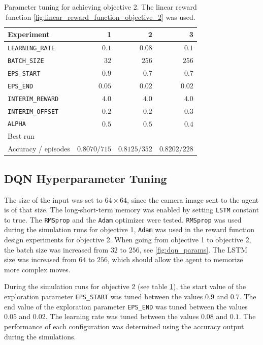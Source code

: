 \documentclass[11pt, onecolumn, oneside, reqno]{amsart}
\begin{document}
\begin{table}[thpb]
	\centering
	\renewcommand{\arraystretch}{1.3}
	\begin{tabular}{|l|r|r|r|}
	\hline
	Experiment & 1 & 2 & 3 \\
	\hline
	\texttt{LEARNING\_RATE} & $0.1$  & $0.08$ & $0.1$  \\
	\texttt{BATCH\_SIZE}    & $32$   & $256$  & $256$  \\
	\texttt{EPS\_START}     & $0.9$  & $0.7$  & $0.7$  \\
	\texttt{EPS\_END}       & $0.05$ & $0.02$ & $0.02$ \\
	\hline
	\texttt{INTERIM\_REWARD} & $4.0$ & $4.0$ & $4.0$ \\
	\texttt{INTERIM\_OFFSET} & $0.2$ & $0.2$ & $0.3$ \\
	\hline
	\texttt{ALPHA} & $0.5$ & $0.5$ &  $0.4$\\
	\hline
	\multicolumn{4}{|l|}{Best run} \\ 
	\hline
	Accuracy / episodes & $0.8070 / 715$ &  $0.8125 / 352$ & $0.8202 / 228$ \\
	\hline
	\end{tabular}
	\caption{Parameter tuning for achieving objective 2. The linear reward function \ref{fig:linear_reward_function_objective_2} was used.}
	\label{tab:reward_param_tuning_objective_2}
\end{table}


\subsection{DQN Hyperparameter Tuning}
\label{sec:dqn_parameter_tuning}
The size of the input was set to $64 \times 64$, since the camera image sent to the agent is of that size. The long-short-term memory was enabled by setting \texttt{LSTM} constant to true. The \texttt{RMSprop} and the \texttt{Adam} optimizer \cite{adam_paper} were tested. \texttt{RMSprop} was used during the simulation runs for objective 1, \texttt{Adam} was used in the reward function design experiments for objective 2. When going from objective 1 to objective 2, the batch size was increased from $32$ to $256$, see \ref{fig:dqn_params}. The LSTM size was increased from $64$ to $256$, which should allow the agent to memorize more complex moves. 

During the simulation runs for objective 2 (see table \ref{tab:reward_param_tuning_objective_2}), the start value of the exploration parameter \texttt{EPS\_START} was tuned between the values $0.9$ and $0.7$. The end value of the exploration parameter \texttt{EPS\_END} was tuned between the values $0.05$ and $0.02$. The learning rate was tuned between the values $0.08$ and $0.1$. The performance of each configuration was determined using the accuracy output during the simulations.
\end{document}

